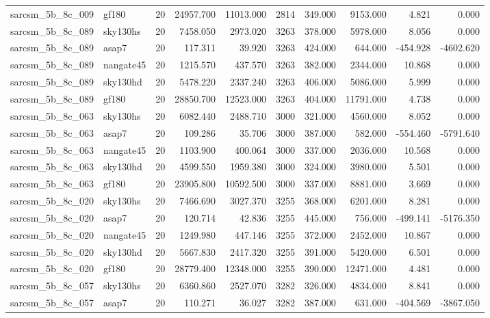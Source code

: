 \begin{longtable}{llrrrrrrrr}
sarcsm\_5b\_8c\_009 & gf180 & 20 & 24957.700 & 11013.000 & 2814 & 349.000 & 9153.000 & 4.821 & 0.000 \\
sarcsm\_5b\_8c\_089 & sky130hs & 20 & 7458.050 & 2973.020 & 3263 & 378.000 & 5978.000 & 8.056 & 0.000 \\
sarcsm\_5b\_8c\_089 & asap7 & 20 & 117.311 & 39.920 & 3263 & 424.000 & 644.000 & -454.928 & -4602.620 \\
sarcsm\_5b\_8c\_089 & nangate45 & 20 & 1215.570 & 437.570 & 3263 & 382.000 & 2344.000 & 10.868 & 0.000 \\
sarcsm\_5b\_8c\_089 & sky130hd & 20 & 5478.220 & 2337.240 & 3263 & 406.000 & 5086.000 & 5.999 & 0.000 \\
sarcsm\_5b\_8c\_089 & gf180 & 20 & 28850.700 & 12523.000 & 3263 & 404.000 & 11791.000 & 4.738 & 0.000 \\
sarcsm\_5b\_8c\_063 & sky130hs & 20 & 6082.440 & 2488.710 & 3000 & 321.000 & 4560.000 & 8.052 & 0.000 \\
sarcsm\_5b\_8c\_063 & asap7 & 20 & 109.286 & 35.706 & 3000 & 387.000 & 582.000 & -554.460 & -5791.640 \\
sarcsm\_5b\_8c\_063 & nangate45 & 20 & 1103.900 & 400.064 & 3000 & 337.000 & 2036.000 & 10.568 & 0.000 \\
sarcsm\_5b\_8c\_063 & sky130hd & 20 & 4599.550 & 1959.380 & 3000 & 324.000 & 3980.000 & 5.501 & 0.000 \\
sarcsm\_5b\_8c\_063 & gf180 & 20 & 23905.800 & 10592.500 & 3000 & 337.000 & 8881.000 & 3.669 & 0.000 \\
sarcsm\_5b\_8c\_020 & sky130hs & 20 & 7466.690 & 3027.370 & 3255 & 368.000 & 6201.000 & 8.281 & 0.000 \\
sarcsm\_5b\_8c\_020 & asap7 & 20 & 120.714 & 42.836 & 3255 & 445.000 & 756.000 & -499.141 & -5176.350 \\
sarcsm\_5b\_8c\_020 & nangate45 & 20 & 1249.980 & 447.146 & 3255 & 372.000 & 2452.000 & 10.867 & 0.000 \\
sarcsm\_5b\_8c\_020 & sky130hd & 20 & 5667.830 & 2417.320 & 3255 & 391.000 & 5420.000 & 6.501 & 0.000 \\
sarcsm\_5b\_8c\_020 & gf180 & 20 & 28779.400 & 12348.000 & 3255 & 390.000 & 12471.000 & 4.481 & 0.000 \\
sarcsm\_5b\_8c\_057 & sky130hs & 20 & 6360.860 & 2527.070 & 3282 & 326.000 & 4834.000 & 8.841 & 0.000 \\
sarcsm\_5b\_8c\_057 & asap7 & 20 & 110.271 & 36.027 & 3282 & 387.000 & 631.000 & -404.569 & -3867.050 \\

\end{longtable}
